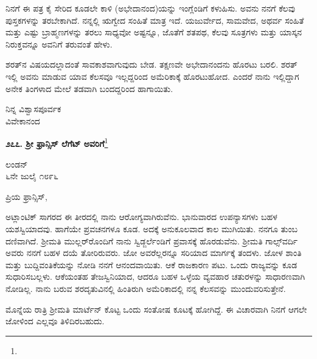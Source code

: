 \vspace{0.2cm}

ನಿನಗೆ ಈ ಪತ್ರ ಕೈ ಸೇರಿದ ಕೂಡಲೇ ಕಾಳಿ (ಅಭೇದಾನಂದ)ಯನ್ನು ಇಂಗ್ಲೆಂಡಿಗೆ ಕಳುಹಿಸು. ಅವನು ನನಗೆ ಕೆಲವು ಪುಸ್ತಕಗಳನ್ನು ತರಬೇಕಾಗಿದೆ. ನನ್ನಲ್ಲಿ ಋಗ್ವೇದ ಸಂಹಿತೆ ಮಾತ್ರ ಇದೆ. ಯಜುರ್ವೇದ, ಸಾಮವೇದ, ಅಥರ್ವ ಸಂಹಿತೆ ಮತ್ತು ಎಷ್ಟು ಬ್ರಾಹ್ಮಣಗಳನ್ನು ತರಲು ಸಾಧ್ಯವೋ ಅಷ್ಟನ್ನೂ, ಜೊತೆಗೆ ಶತಪಥ, ಕೆಲವು ಸೂತ್ರಗಳು ಮತ್ತು ಯಾಸ್ಕನ ನಿರುಕ್ತವನ್ನೂ ಅವನಿಗೆ ತರುವಂತೆ ಹೇಳು.

\vspace{0.2cm}

ಶರತ್‌ನ ವಿಷಯದಲ್ಲಾದಂತೆ ಸಾವಕಾಶವಾಗುವುದು ಬೇಡ. ತಕ್ಷಣವೇ ಅಭೇದಾನಂದನು ಹೊರಟು ಬರಲಿ. ಶರತ್ ಇಲ್ಲಿ ಅವನು ಮಾಡುವ ಯಾವ ಕೆಲಸವೂ ಇಲ್ಲದ್ದರಿಂದ ಅಮೆರಿಕಾಕ್ಕೆ ಹೊರಟುಹೋದ. ಎಂದರೆ ನಾನು ಇಲ್ಲಿದ್ದಾಗ ಅನೇಕ ತಿಂಗಳಾದ ಮೇಲೆ ತಡವಾಗಿ ಬಂದದ್ದರಿಂದ ಹಾಗಾಯಿತು.

{\flushright
ನಿನ್ನ ವಿಶ್ವಾಸಪೂರ್ವಕ\\ವಿವೇಕಾನಂದ\par}

\begin{center}
\textbf{೨೭೭. ಶ‍್ರೀ ಫ್ರಾನ್ಸಿಸ್ ಲೆಗೆಟ್ ಅವರಿಗೆ}\footnote{}
\end{center}

\begin{flushright}
ಲಂಡನ್\\೬ನೇ ಜುಲೈ ೧೮೯೬
\end{flushright}

\noindent
ಪ್ರಿಯ ಫ್ರಾನ್ಸಿಸ್,

\vspace{0.2cm}

ಅಟ್ಲಾಂಟಿಕ್ ಸಾಗರದ ಈ ತೀರದಲ್ಲಿ ನಾನು ಆರೋಗ್ಯವಾಗಿರುವೆನು. ಭಾನುವಾರದ ಉಪನ್ಯಾಸಗಳು ಬಹಳ ಯಶಸ್ವಿಯಾದವು. ಹಾಗೆಯೇ ಪ್ರವಚನಗಳೂ ಕೂಡ. ಅದಕ್ಕೆ ಅನುಕೂಲವಾದ ಕಾಲ ಮುಗಿಯಿತು. ನನಗೂ ತುಂಬ ದಣಿವಾಗಿದೆ. ಶ‍್ರೀಮತಿ ಮುಲ್ಲರ್‌ರೊಂದಿಗೆ ನಾನು ಸ್ವಿಡ್ಜರ್ಲೆಂಡಿಗೆ ಪ್ರವಾಸಕ್ಕೆ ಹೊರಡುವೆನು. ಶ‍್ರೀಮತಿ ಗಾಲ್ಸ್‌ವರ್ದಿ ಅವರು ನನಗೆ ಬಹಳ ದಯೆ ತೋರಿರುವರು. ಜೋ\enginline{-} ಅವರೆಲ್ಲರನ್ನೂ ಸರಿಯಾದ ಮಾರ್ಗಕ್ಕೆ ತಂದಳು. ಜೋ\enginline{-}ಳ ಶಾಂತಿ ಮತ್ತು ಬುದ್ದಿವಂತಿಕೆಯನ್ನು ನೋಡಿ ನನಗೆ ಆನಂದವಾಯಿತು. ಆಕೆ ರಾಜಕಾರಣ ಪಟು. ಒಂದು ರಾಜ್ಯವನ್ನು ಕೂಡ ಸುಧಾರಿಸಬಲ್ಲಳು. ಆಕೆಯಂತಹ ತೇಜಸ್ವಿನಿಯಾದ, ಆದರೂ ಬಹಳ ಒಳ್ಳೆಯ ವ್ಯವಹಾರ ಚತುರಳನ್ನು ಸಾಧಾರಣವಾಗಿ ನೋಡಿಲ್ಲ. ನಾನು ಬರುವ ಶರದೃತುವಿನಲ್ಲಿ ಹಿಂತಿರುಗಿ ಅಮೆರಿಕಾದಲ್ಲಿ ನನ್ನ ಕೆಲಸವನ್ನು ಮುಂದುವರಿಸುತ್ತೇನೆ.

\vspace{0.2cm}

ಮೊನ್ನೆಯ ರಾತ್ರಿ ಶ‍್ರೀಮತಿ ಮಾರ್ಟೆನ್ ಕೊಟ್ಟ ಒಂದು ಸಂತೋಷ ಕೂಟಕ್ಕೆ ಹೋಗಿದ್ದೆ. ಈ ವಿಚಾರವಾಗಿ ನಿನಗೆ ಆಗಲೇ ಜೋಳಿಂದ ಎಲ್ಲವೂ ತಿಳಿದಿರಬಹುದು.

\vspace{0.2cm}

